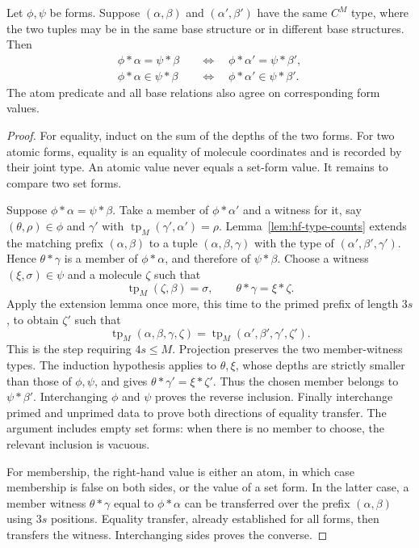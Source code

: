 \begin{lemma}
\label{lem:hf-atomic-transfer}
Let $\phi,\psi$ be forms.  Suppose $(\alpha,\beta)$ and
$(\alpha',\beta')$ have the same $C^M$ type, where the two tuples may be
in the same base structure or in different base structures.  Then
\begin{align*}
 \phi*\alpha=\psi*\beta
   &\quad\Longleftrightarrow\quad
       \phi*\alpha'=\psi*\beta',\\
 \phi*\alpha\in\psi*\beta
   &\quad\Longleftrightarrow\quad
       \phi*\alpha'\in\psi*\beta'.
\end{align*}
The atom predicate and all base relations also agree on corresponding
form values.
\end{lemma}

\begin{proof}
For equality, induct on the sum of the depths of the two forms.  For two
atomic forms, equality is an equality of molecule coordinates and is
recorded by their joint type.  An atomic value never equals a set-form
value.  It remains to compare two set forms.

Suppose $\phi*\alpha=\psi*\beta$.  Take a member of
$\phi*\alpha'$ and a witness for it, say $(\theta,\rho)\in\phi$ and
$\gamma'$ with $\operatorname{tp}_M(\gamma',\alpha')=\rho$.
Lemma~\ref{lem:hf-type-counts} extends the matching prefix
$(\alpha,\beta)$ to a tuple $(\alpha,\beta,\gamma)$ with the type of
$(\alpha',\beta',\gamma')$.  Hence $\theta*\gamma$ is a member of
$\phi*\alpha$, and therefore of $\psi*\beta$.  Choose a witness
$(\xi,\sigma)\in\psi$ and a molecule $\zeta$ such that
\[
 \operatorname{tp}_M(\zeta,\beta)=\sigma,
 \qquad \theta*\gamma=\xi*\zeta.
\]
Apply the extension lemma once more, this time to the primed prefix of
length $3s$, to obtain $\zeta'$ such that
\[
 \operatorname{tp}_M(\alpha,\beta,\gamma,\zeta)
   =\operatorname{tp}_M(\alpha',\beta',\gamma',\zeta').
\]
This is the step requiring $4s\leq M$.  Projection preserves the two
member-witness types.  The induction hypothesis applies to $\theta,\xi$,
whose depths are strictly smaller than those of $\phi,\psi$, and gives
$\theta*\gamma'=\xi*\zeta'$.  Thus the chosen member belongs to
$\psi*\beta'$.  Interchanging $\phi$ and $\psi$ proves the reverse
inclusion.  Finally interchange primed and unprimed data to prove both
directions of equality transfer.  The argument includes empty set forms:
when there is no member to choose, the relevant inclusion is vacuous.

For membership, the right-hand value is either an atom, in which case
membership is false on both sides, or the value of a set form.  In the
latter case, a member witness $\theta*\gamma$ equal to $\phi*\alpha$
can be transferred over the prefix $(\alpha,\beta)$ using $3s$ positions.
Equality transfer, already established for all forms, then transfers the
witness.  Interchanging sides proves the converse.


\end{proof}
